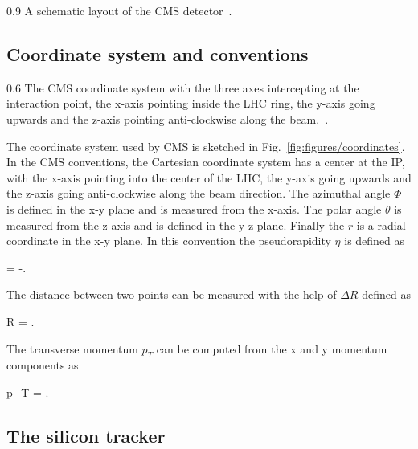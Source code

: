                  {0.9}       %
                 { A schematic layout of the CMS detector~\cite{website:CMSdet}. }

\subsection{Coordinate system and conventions}

                 {0.6}       %
                 { The CMS coordinate system with the three axes intercepting at the interaction point, the x-axis pointing inside the LHC ring, the y-axis going upwards and the z-axis pointing anti-clockwise along the beam.~\cite{Pantaleo:2293435}. }

The coordinate system used by CMS is sketched in Fig.~\ref{fig:figures/coordinates}. In the CMS conventions, the Cartesian coordinate system has a center at the IP, with the x-axis pointing into the center of the LHC, the y-axis going upwards and the z-axis going anti-clockwise along the beam direction. The azimuthal angle $\Phi$ is defined in the x-y plane and is measured from the x-axis. The polar angle $\theta$ is measured from the z-axis and is defined in the y-z plane. Finally the $r$ is a radial coordinate in the x-y plane. In this convention the pseudorapidity $\eta$ is defined as

{
    \eta =  -\ln {}.
}

The distance between two points can be measured with the help of $\Delta R$ defined as

{
    \Delta R = .
}


The transverse momentum $p_{T}$ can be computed from the x and y momentum components as

{
    p_{T} =  .
}



\subsection{The silicon tracker}

